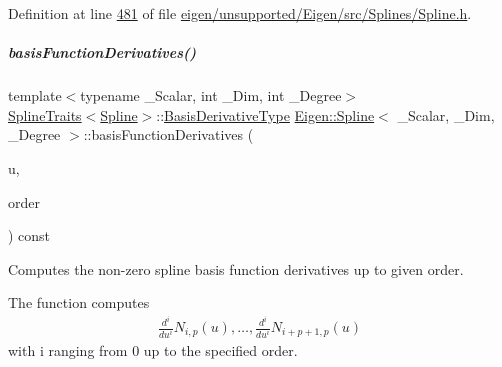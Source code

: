 Definition at line \hyperlink{eigen_2unsupported_2_eigen_2src_2_splines_2_spline_8h_source_l00481}{481} of file \hyperlink{eigen_2unsupported_2_eigen_2src_2_splines_2_spline_8h_source}{eigen/unsupported/\+Eigen/src/\+Splines/\+Spline.\+h}.

\mbox{\label{group___splines___module_a54c268e55c0e2418f698ec59703c155d}} 
\subparagraph{\texorpdfstring{basis\+Function\+Derivatives()}{basisFunctionDerivatives()}\hspace{0.1cm}{\footnotesize\ttfamily [2/4]}}
{\footnotesize\ttfamily template$<$typename \+\_\+\+Scalar, int \+\_\+\+Dim, int \+\_\+\+Degree$>$ \\
\hyperlink{struct_eigen_1_1_spline_traits}{Spline\+Traits}$<$\hyperlink{group___splines___module_class_eigen_1_1_spline}{Spline}$>$\+::\hyperlink{group___splines___module_a9db0b0108353660cd03524f2e67d6b3c}{Basis\+Derivative\+Type} \hyperlink{group___splines___module_class_eigen_1_1_spline}{Eigen\+::\+Spline}$<$ \+\_\+\+Scalar, \+\_\+\+Dim, \+\_\+\+Degree $>$\+::basis\+Function\+Derivatives (\begin{DoxyParamCaption}\item[{\hyperlink{group___splines___module_a8cafd78b564825c76fbb3419653d9742}{Scalar}}]{u,  }\item[{Dense\+Index}]{order }\end{DoxyParamCaption}) const}



Computes the non-\/zero spline basis function derivatives up to given order. 

The function computes \begin{align*} \frac{d^i}{du^i} N_{i,p}(u), \hdots, \frac{d^i}{du^i} N_{i+p+1,p}(u) \end{align*} with i ranging from 0 up to the specified order.


